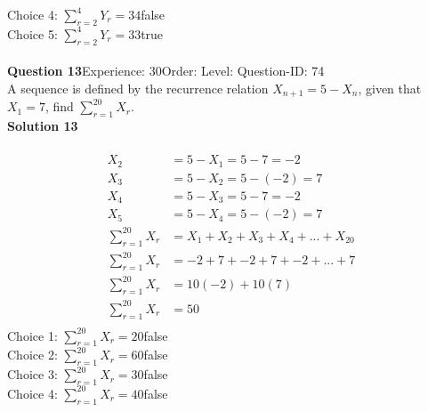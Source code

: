 \documentclass{article}
\begin{document}
Choice 4: \hspace{20pt}$\displaystyle\sum_{r=2}^{4} Y_r=34$\hspace{20pt}false\\
Choice 5: \hspace{20pt}$\displaystyle\sum_{r=2}^{4} Y_r=33$\hspace{20pt}true\\
\\[4pt]
\noindent\textbf{Question 13}\hspace{20pt}Experience: 30\hspace{20pt}Order: \hspace{20pt}Level: \hspace{20pt}Question-ID: 74\\[2pt]
A sequence is defined by the recurrence relation $X_{n+1}=5-X_n$, given that  $X_1 =7$, find $\displaystyle\sum_{r=1}^{20} X_r$.\\[4pt]
\noindent\textbf{Solution 13}\\[2pt]
\\[-35pt]\begin{align*}
X_2&=5-X_1=5-7=-2\\[7pt]
X_3&=5-X_2=5-(-2)=7\\[7pt]
X_4&=5-X_3=5-7=-2\\[7pt]
X_5&=5-X_4=5-(-2)=7\\[7pt]
\displaystyle\sum_{r=1}^{20} X_r &= X_1+X_2+X_3+X_4+...+X_{20}\\[2pt]
\displaystyle\sum_{r=1}^{20} X_r &= -2+7+-2+7+-2+...+7\\[2pt]
\displaystyle\sum_{r=1}^{20} X_r &= 10(-2)+10(7)\\[2pt]
\displaystyle\sum_{r=1}^{20} X_r &= 50\\[2pt]
\end{align*}
Choice 1: \hspace{20pt}$\displaystyle\sum_{r=1}^{20} X_r= 20$\hspace{20pt}false\\
Choice 2: \hspace{20pt}$\displaystyle\sum_{r=1}^{20} X_r= 60$\hspace{20pt}false\\
Choice 3: \hspace{20pt}$\displaystyle\sum_{r=1}^{20} X_r= 30$\hspace{20pt}false\\
Choice 4: \hspace{20pt}$\displaystyle\sum_{r=1}^{20} X_r= 40$\hspace{20pt}false\\
\end{document}
